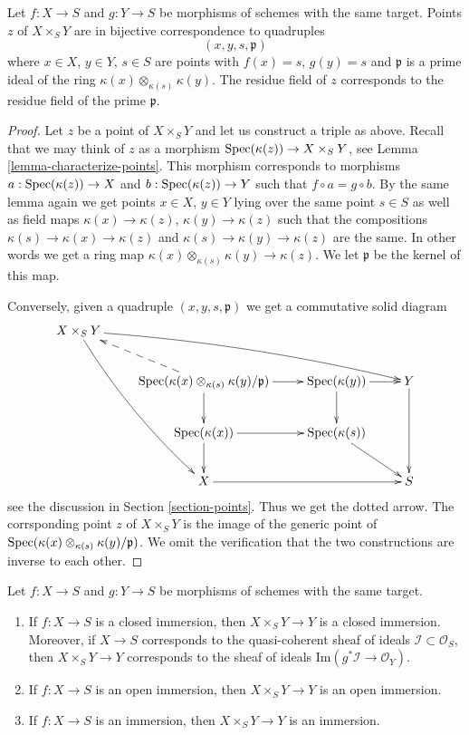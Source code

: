 \begin{lemma}
\label{lemma-points-fibre-product}
Let $f : X \to S$ and $g : Y \to S$ be morphisms of schemes
with the same target. Points $z$ of $X \times_S Y$ are in bijective
correspondence to quadruples
$$
(x, y, s, \mathfrak p)
$$
where $x \in X$, $y \in Y$, $s \in S$ are points with
$f(x) = s$, $g(y) = s$ and $\mathfrak p$ is a prime ideal
of the ring $\kappa(x) \otimes_{\kappa(s)} \kappa(y)$.
The residue field of $z$ corresponds to
the residue field of the prime $\mathfrak p$.
\end{lemma}

\begin{proof}
Let $z$ be a point of $X \times_S Y$ and let us construct a
triple as above. Recall that we may think of $z$ as a morphism
$\mathop{\rm Spec}(\kappa(z)) \to X \times_S Y$, see
Lemma \ref{lemma-characterize-points}. This morphism corresponds
to morphisms $a : \mathop{\rm Spec}(\kappa(z)) \to X$
and $b : \mathop{\rm Spec}(\kappa(z)) \to Y$ such that
$f \circ a = g \circ b$. By the same lemma again
we get points $x \in X$, $y \in Y$ lying over the same point
$s \in S$ as well as field maps $\kappa(x) \to \kappa(z)$,
$\kappa(y) \to \kappa(z)$ such that the compositions
$\kappa(s) \to \kappa(x) \to \kappa(z)$
and
$\kappa(s) \to \kappa(y) \to \kappa(z)$
are the same. In other words we get a ring map
$\kappa(x) \otimes_{\kappa(s)} \kappa(y) \to \kappa(z)$.
We let $\mathfrak p$ be the kernel of this map.

\medskip\noindent
Conversely, given a quadruple $(x, y, s, \mathfrak p)$ we get a
commutative solid diagram
$$
\xymatrix{
X \times_S Y
\ar@/_/[dddr] \ar@/^/[rrrd]
& & & \\
&
\Spec(\kappa(x) \otimes_{\kappa(s)} \kappa(y)/\mathfrak p)
\ar[r] \ar[d] \ar@{-->}[lu]
&
\Spec(\kappa(y)) \ar[d] \ar[r] &
Y \ar[dd] \\
&
\Spec(\kappa(x)) \ar[r] \ar[d] &
\Spec(\kappa(s)) \ar[rd] &
\\
&
X \ar[rr] &
&
S
}
$$
see the discussion in Section \ref{section-points}. Thus we get the
dotted arrow. The corrsponding point $z$ of $X \times_S Y$ is the
image of the generic point of
$\mathop{\rm Spec}(\kappa(x) \otimes_{\kappa(s)} \kappa(y)/\mathfrak p)$.
We omit the verification that the two constructions are inverse
to each other.
\end{proof}

\begin{lemma}
\label{lemma-fibre-product-immersion}
Let $f : X \to S$ and $g : Y \to S$ be morphisms of schemes
with the same target.
\begin{enumerate}
\item If $f : X \to S$ is a closed immersion,
then $X \times_S Y \to Y$ is a closed immersion.
Moreover, if $X \to S$ corresponds to the quasi-coherent
sheaf of ideals $\mathcal{I} \subset \mathcal{O}_S$, then
$X \times_S Y \to Y$ corresponds to the sheaf of ideals
$\text{Im}(g^*\mathcal{I} \to \mathcal{O}_Y)$.
\item If $f : X \to S$ is an open immersion,
then $X \times_S Y \to Y$ is an open immersion.
\item If $f : X \to S$ is an immersion,
then $X \times_S Y \to Y$ is an immersion.
\end{enumerate}
\end{lemma}


